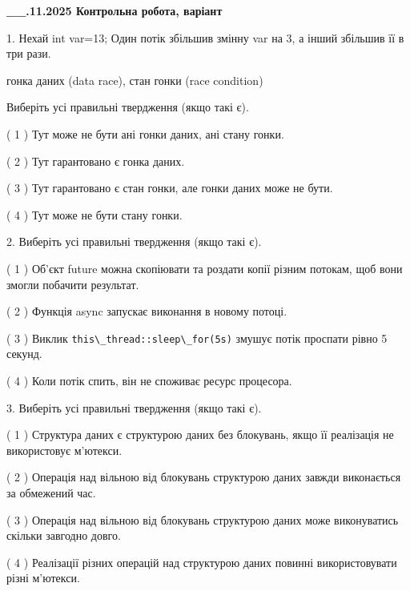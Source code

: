 \documentclass[12pt, ukrainian]{article}
\def\code#1{\Verb!#1!}
\begin{document}
\newpage
\begin {large}

\textbf{\_\_.11.2025 Контрольна робота, варіант  }\par


{
1. Нехай int var=13; Один потік збільшив змінну var на 3, а інший збільшив її в три рази.

гонка даних (data race), стан гонки (race condition)

Виберіть усі правильні твердження (якщо такі є).\par
\vspace{2mm}
( 1 ) Тут може не бути ані гонки даних, ані стану гонки.%

( 2 ) Тут гарантовано є гонка даних.%

( 3 ) Тут гарантовано є стан гонки, але гонки даних може не бути.%

( 4 ) Тут може не бути стану гонки.%


2. Виберіть усі правильні твердження (якщо такі є).\par
\vspace{2mm}

( 1 ) Об’єкт future можна скопіювати та роздати копії різним потокам, щоб вони змогли побачити результат.%

( 2 ) Функція async запускає виконання в новому потоці.%

( 3 ) Виклик \code{this\_thread::sleep\_for(5s)} змушує потік проспати рівно 5 секунд.%

( 4 ) Коли потік спить, він не споживає ресурс процесора.%


3. Виберіть усі правильні твердження (якщо такі є).\par
\vspace{2mm}

( 1 ) Структура даних є структурою даних без блокувань, якщо її реалізація не використовує м’ютекси.%

( 2 ) Операція над вільною від блокувань структурою даних завжди виконається за обмежений час.%

( 3 ) Операція над вільною від блокувань структурою даних може виконуватись скільки завгодно довго.%

( 4 ) Реалізації різних операцій над структурою даних повинні використовувати різні м’ютекси.%


}
\end{large}
\end{document}
